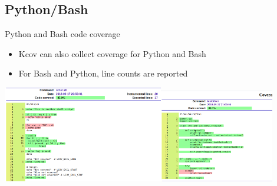 \documentclass{beamer}
\begin{document}
\subsection{Python/Bash}
\begin{frame}{Python and Bash code coverage}
  \begin{itemize}
  \item Kcov can also collect coverage for Python and Bash
  \item For Bash and Python, line counts are reported
  \end{itemize}

  \includegraphics[width=7cm]{bash}\includegraphics[width=5cm]{python}
\end{frame}
\end{document}
